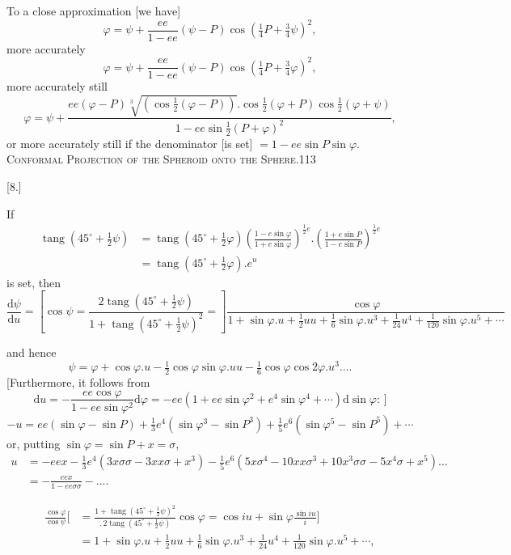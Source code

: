To a close approximation [we have]
\[
\varphi=\psi+\frac{ee}{1-ee}(\psi-P)\cos(\tfrac14P+\tfrac34\psi)^2,
\]
more accurately
\[
\varphi=\psi+\frac{ee}{1-ee}(\psi-P)\cos(\tfrac14P+\tfrac34\varphi)^2,
\]
more accurately still
\[
\varphi=\psi+\frac{ee(\varphi-P)\sqrt[3]{(\cos\frac12(\varphi-P))}.\cos\frac12(\varphi+P)\cos\frac12(\varphi+\psi)}{1-ee\sin\frac12(P+\varphi)^2},
\]
or more accurately still if the denominator [is set] $=1-ee\sin P\sin\varphi$.
\clearpage
\noindent\mbox{}\hfill{\small\textsc{Conformal Projection of the Spheroid onto the Sphere.}}\hfill113\par\bigskip
\begin{center}[8.]\end{center}
If
\[
\begin{aligned}
\operatorname{tang}(45^\circ+\tfrac12\psi)&=\operatorname{tang}(45^\circ+\tfrac12\varphi)\left(\frac{1-e\sin\varphi}{1+e\sin\varphi}\right)^{\frac12e}.\left(\frac{1+e\sin P}{1-e\sin P}\right)^{\frac12e}\\
&=\operatorname{tang}(45^\circ+\tfrac12\varphi).e^u
\end{aligned}
\]
is set, then
\begingroup\footnotesize
\[
\frac{\mathrm d\psi}{\mathrm du}=\left[\cos\psi=\frac{2\operatorname{tang}(45^\circ+\frac12\psi)}{1+\operatorname{tang}(45^\circ+\frac12\psi)^2}=\right]
\frac{\cos\varphi}{1+\sin\varphi.u+\frac12uu+\frac16\sin\varphi.u^3+\frac1{24}u^4+\frac1{120}\sin\varphi.u^5+\cdots}
\]
\par\endgroup
and hence
\[
\psi=\varphi+\cos\varphi.u-\tfrac12\cos\varphi\sin\varphi.uu-\tfrac16\cos\varphi\cos2\varphi.u^3\ldots.
\]
[Furthermore, it follows from
\[
\mathrm du=-\frac{ee\cos\varphi}{1-ee\sin\varphi^2}\mathrm d\varphi=-ee(1+ee\sin\varphi^2+e^4\sin\varphi^4+\cdots)\mathrm d\sin\varphi:\,]
\]
\[
-u=ee(\sin\varphi-\sin P)+\tfrac13e^4(\sin\varphi^3-\sin P^3)+\tfrac15e^6(\sin\varphi^5-\sin P^5)+\cdots
\]
or, putting $\sin\varphi=\sin P+x=\sigma$,
\begingroup\small
\[
\begin{aligned}
u&=-eex-\tfrac13e^4(3x\sigma\sigma-3xx\sigma+x^3)-\tfrac15e^6(5x\sigma^4-10xx\sigma^3+10x^3\sigma\sigma-5x^4\sigma+x^5)\ldots\\
&=-\frac{eex}{1-ee\sigma\sigma}-\ldots.
\end{aligned}
\]
\par{}
\begingroup\small
\[
\begin{aligned}
\frac{\cos\varphi}{\cos\psi}\bigg[&=\frac{1+\operatorname{tang}(45^\circ+\frac12\psi)^2}{.\,2\operatorname{tang}(45^\circ+\frac12\psi)}\cos\varphi=\cos iu+\sin\varphi\frac{\sin iu}{i}\bigg]\\
&=1+\sin\varphi.u+\tfrac12uu+\tfrac16\sin\varphi.u^3+\tfrac1{24}u^4+\tfrac1{120}\sin\varphi.u^5+\cdots,
\end{aligned}
\]
